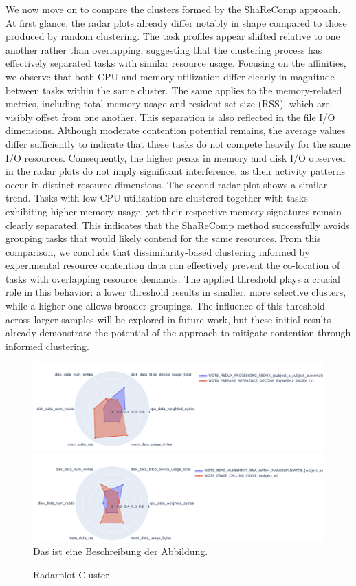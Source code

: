 We now move on to compare the clusters formed by the ShaReComp approach. At first glance, the radar plots already differ notably in shape compared to those produced by random clustering. The task profiles appear shifted relative to one another rather than overlapping, suggesting that the clustering process has effectively separated tasks with similar resource usage. Focusing on the affinities, we observe that both CPU and memory utilization differ clearly in magnitude between tasks within the same cluster. The same applies to the memory-related metrics, including total memory usage and resident set size (RSS), which are visibly offset from one another.
This separation is also reflected in the file I/O dimensions. Although moderate contention potential remains, the average values differ sufficiently to indicate that these tasks do not compete heavily for the same I/O resources. Consequently, the higher peaks in memory and disk I/O observed in the radar plots do not imply significant interference, as their activity patterns occur in distinct resource dimensions.
The second radar plot shows a similar trend. Tasks with low CPU utilization are clustered together with tasks exhibiting higher memory usage, yet their respective memory signatures remain clearly separated. This indicates that the ShaReComp method successfully avoids grouping tasks that would likely contend for the same resources.
From this comparison, we conclude that dissimilarity-based clustering informed by experimental resource contention data can effectively prevent the co-location of tasks with overlapping resource demands. The applied threshold plays a crucial role in this behavior: a lower threshold results in smaller, more selective clusters, while a higher one allows broader groupings. The influence of this threshold across larger samples will be explored in future work, but these initial results already demonstrate the potential of the approach to mitigate contention through informed clustering.

\begin{figure}[H]
    \caption{Radarplot Cluster}
    \includegraphics[scale=0.45]{fig/06/06-radarplot-cluster.png}
    \includegraphics[scale=0.45]{fig/06/06-radarplot-cluster-2.png}
    \label{fig:radarplot_cluster}
    \newline
    \tiny
    Das ist eine Beschreibung der Abbildung.
\end{figure}

